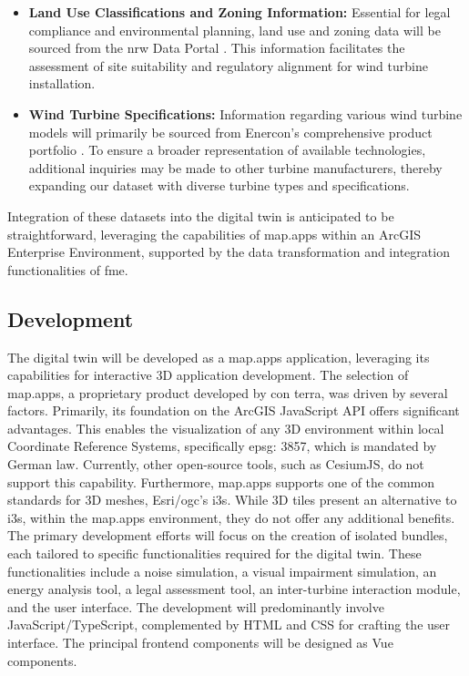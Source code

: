\documentclass[11pt, titlepage, a4paper]{scrartcl}
\begin{document}
\begin{linenumbers}
\begin{itemize}
        \item \textbf{Land Use Classifications and Zoning Information:} Essential for legal compliance and environmental planning, land use and zoning data will be sourced from the \gls{nrw} Data Portal \cite{ministeriumfurheimatkommunalesbauunddigitalisierungdeslandesnordrhein-westfalenOpenNRW}. This information facilitates the assessment of site suitability and regulatory alignment for wind turbine installation.

        \item \textbf{Wind Turbine Specifications:} Information regarding various wind turbine models will primarily be sourced from Enercon’s comprehensive product portfolio \cite{enerconglobalgmbhENERCONWindenergieanlagenPortfolio}. To ensure a broader representation of available technologies, additional inquiries may be made to other turbine manufacturers, thereby expanding our dataset with diverse turbine types and specifications.
    \end{itemize}

    Integration of these datasets into the digital twin is anticipated to be straightforward, leveraging the capabilities of map.apps within an ArcGIS Enterprise Environment, supported by the data transformation and integration functionalities of \gls{fme}.




    \subsection{Development}
    The digital twin will be developed as a map.apps application, leveraging its capabilities for interactive 3D application development. The selection of map.apps, a proprietary product developed by con terra, was driven by several factors. Primarily, its foundation on the ArcGIS JavaScript API offers significant advantages. This  enables the visualization of any 3D environment within local Coordinate Reference Systems, specifically \gls{epsg}: 3857, which is mandated by German law. Currently, other open-source tools, such as CesiumJS, do not support this capability. Furthermore, map.apps supports one of the common standards for 3D meshes, Esri/\gls{ogc}'s \gls{i3s}. While 3D tiles present an alternative to \gls{i3s}, within the map.apps environment, they do not offer any additional benefits. The primary development efforts will focus on the creation of isolated bundles, each tailored to specific functionalities required for the digital twin. These functionalities include a noise simulation, a visual impairment simulation, an energy analysis tool, a legal assessment tool, an inter-turbine interaction module, and the user interface. The development will predominantly involve JavaScript/TypeScript, complemented by HTML and CSS for crafting the user interface. The principal frontend components will be designed as Vue components.


\end{linenumbers}
\end{document}
